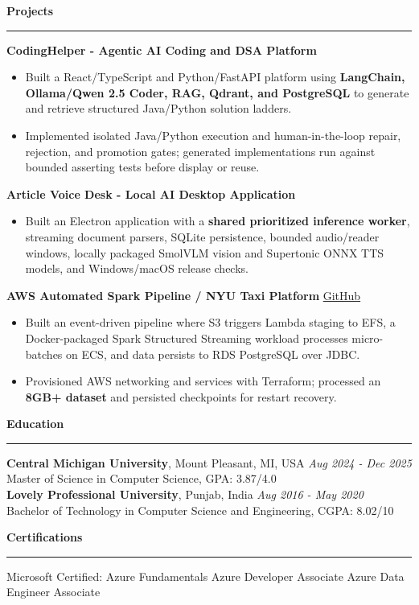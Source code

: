 \documentclass[11pt,letterpaper]{article}
\newcommand{\ressection}[1]{\Needspace{6\baselineskip}\vspace{8pt}\par\textbf{#1}\par\vspace{2pt}\hrule\vspace{5pt}}
\begin{document}
\ressection{Projects}
\textbf{CodingHelper - Agentic AI Coding and DSA Platform}
\begin{itemize}
  \item Built a React/TypeScript and Python/FastAPI platform using \textbf{LangChain, Ollama/Qwen 2.5 Coder, RAG, Qdrant, and PostgreSQL} to generate and retrieve structured Java/Python solution ladders.
  \item Implemented isolated Java/Python execution and human-in-the-loop repair, rejection, and promotion gates; generated implementations run against bounded asserting tests before display or reuse.
\end{itemize}
\par\vspace{2pt}
\textbf{Article Voice Desk - Local AI Desktop Application}
\begin{itemize}
  \item Built an Electron application with a \textbf{shared prioritized inference worker}, streaming document parsers, SQLite persistence, bounded audio/reader windows, locally packaged SmolVLM vision and Supertonic ONNX TTS models, and Windows/macOS release checks.
\end{itemize}
\par\vspace{2pt}
\textbf{AWS Automated Spark Pipeline / NYU Taxi Platform} \hfill \href{https://github.com/preferablehuman/AWS-automated-spark-pipeline}{GitHub}
\begin{itemize}
  \item Built an event-driven pipeline where S3 triggers Lambda staging to EFS, a Docker-packaged Spark Structured Streaming workload processes micro-batches on ECS, and data persists to RDS PostgreSQL over JDBC.
  \item Provisioned AWS networking and services with Terraform; processed an \textbf{8GB+ dataset} and persisted checkpoints for restart recovery.
\end{itemize}

\ressection{Education}
\textbf{Central Michigan University}, Mount Pleasant, MI, USA \hfill \textit{Aug 2024 - Dec 2025}\\
Master of Science in Computer Science, GPA: 3.87/4.0\\
\textbf{Lovely Professional University}, Punjab, India \hfill \textit{Aug 2016 - May 2020}\\
Bachelor of Technology in Computer Science and Engineering, CGPA: 8.02/10

\ressection{Certifications}
Microsoft Certified: Azure Fundamentals \textbar{} Azure Developer Associate \textbar{} Azure Data Engineer Associate
\end{document}
